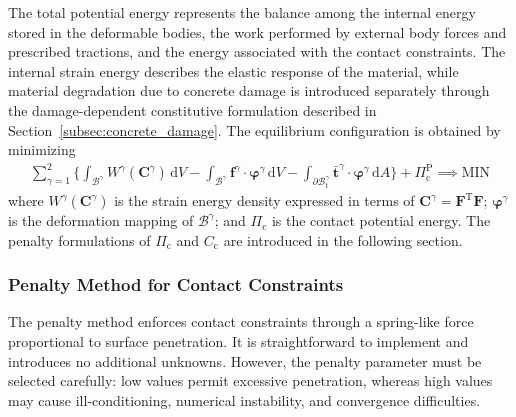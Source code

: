\documentclass[review, authoryear, 12pt]{elsarticle}
\begin{document}
The total potential energy represents the balance among the internal energy stored in the deformable bodies, the work performed by external body forces and prescribed tractions, and the energy associated with the contact constraints. The internal strain energy describes the elastic response of the material, while material degradation due to concrete damage is introduced separately through the damage-dependent constitutive formulation described in Section~\ref{subsec:concrete_damage}. The equilibrium configuration is obtained by minimizing
\begin{align}
    \sum_{\gamma=1}^2 \Bigg\{ 
        \int_{\bm{\mathcal{B}}^{\gamma}} W^{\gamma}(\mathbf{C}^{\gamma}) \, \text{d}V 
        - \int_{\bm{\mathcal{B}}^{\gamma}} \mathbf{f}^{\gamma} \cdot \bm{\varphi}^{\gamma} \, \text{d}V 
        - \int_{\partial \bm{\mathcal{B}}_{\text{t}}^{\gamma}} \bar{\mathbf{t}}^{\gamma} \cdot \bm{\varphi}^{\gamma} \, \text{d}A 
    \Bigg\} 
    + \Pi_{\text{c}}^{\text{P}} \implies \text{MIN} \label{eq:min_total_energy} %
\end{align}
where $W^{\gamma}(\mathbf{C}^{\gamma})$ is the strain energy density expressed in terms of $\mathbf{C}^{\gamma} = \mathbf{F}^{\text{T}} \mathbf{F}$; $\bm{\varphi}^{\gamma}$ is the deformation mapping of $\bm{\mathcal{B}}^{\gamma}$; and $\Pi_{\text{c}}$ is the contact potential energy. The penalty formulations of $\Pi_{\text{c}}$ and $C_{\text{c}}$ are introduced in the following section.

\subsubsection{Penalty Method for Contact Constraints}
\label{subsubsec:penalty_method}

The penalty method enforces contact constraints through a spring-like force proportional to surface penetration. It is straightforward to implement and introduces no additional unknowns. However, the penalty parameter must be selected carefully: low values permit excessive penetration, whereas high values may cause ill-conditioning, numerical instability, and convergence difficulties.
\end{document}
